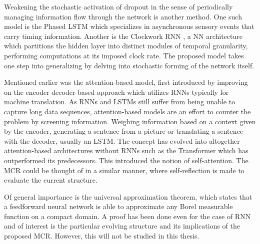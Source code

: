 Weakening the stochastic activation of dropout in the sense of periodically managing information flow through the network is another method. One such model is the Phased LSTM \cite{phaselstm} which specializes in asynchronous sensory events that carry timing information. Another is the Clockwork RNN \cite{Clockwork}, a NN architecture which partitions the hidden layer into distinct modules of temporal granularity, performing computations at its imposed clock rate. The proposed model takes one step into generalizing by delving into stochastic forming of the network itself.

Mentioned earlier was the attention-based model, first introduced by \textcite{att} improving on the encoder decoder-based approach which utilizes RNNs typically for machine translation. As RNNs and LSTMs still suffer from being unable to capture long data sequences, attention-based models are an effort to counter the problem by screening information. Weighing information based on a context given by the encoder, generating a sentence from a picture or translating a sentence with the decoder, usually an LSTM. The concept has evolved into altogether attention-based architectures without RNNs such as the Transformer\cite{trans} which has outperformed its predecessors. This introduced the notion of self-attention. The MCR could be thought of in a similar manner, where self-reflection is made to evaluate the current structure. 

Of general importance is the universal approximation theorem, which states that a feedforward neural network is able to approximate any Borel measurable function on a compact domain. A proof has been done even for the case of RNN \cite{uarnn} and of interest is the particular evolving structure and its implications of the proposed MCR. However, this will not be studied in this thesis.

